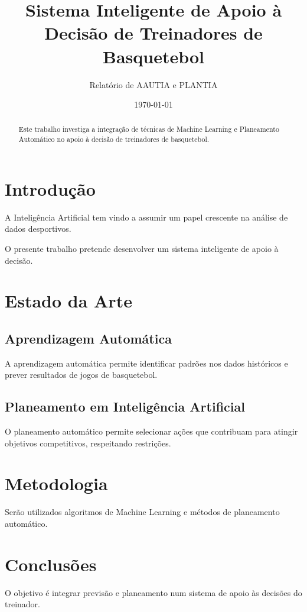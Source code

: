 \documentclass[12pt,a4paper]{report}
\title{Sistema Inteligente de Apoio à Decisão
de Treinadores de Basquetebol}
\author{Relatório de AAUTIA e PLANTIA}
\date{\today}
\begin{document}
\maketitle

\begin{abstract}
Este trabalho investiga a integração de técnicas
de Machine Learning e Planeamento Automático
no apoio à decisão de treinadores de basquetebol.
\end{abstract}

\tableofcontents
\newpage

\section{Introdução}

A Inteligência Artificial tem vindo a assumir
um papel crescente na análise de dados desportivos.

O presente trabalho pretende desenvolver um
sistema inteligente de apoio à decisão.

\section{Estado da Arte}

\subsection{Aprendizagem Automática}

A aprendizagem automática permite identificar
padrões nos dados históricos e prever resultados
de jogos de basquetebol.

\subsection{Planeamento em Inteligência Artificial}

O planeamento automático permite selecionar
ações que contribuam para atingir objetivos
competitivos, respeitando restrições.

\section{Metodologia}

Serão utilizados algoritmos de Machine Learning
e métodos de planeamento automático.

\section{Conclusões}

O objetivo é integrar previsão e planeamento
num sistema de apoio às decisões do treinador.
\end{document}
